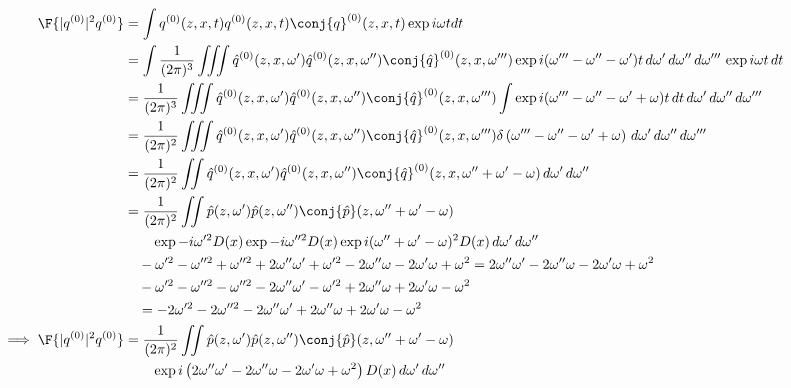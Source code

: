 \begin{equation}
\begin{split}
\F{|q^{(0)}|^2 q^{(0)}} &= \int q^{(0)}(z,x,t)  q^{(0)}(z,x,t) \conj{q}^{(0)}(z,x,t) \exp{i\omega t} dt \\
&= \int \frac{1}{(2\pi)^3} \iiint \hat{q}^{(0)}(z,x,\omega')  \hat{q}^{(0)}(z,x,\omega'') \conj{\hat{q}}^{(0)}(z,x,\omega^{\prime \prime \prime}) \exp{i(\omega^{\prime \prime \prime}-\omega''-\omega')t} \,d\omega' \,d\omega'' \,d\omega^{\prime \prime \prime} \,\exp{i\omega t} \,dt \\
&= \frac{1}{(2\pi)^3} \iiint \hat{q}^{(0)}(z,x,\omega')  \hat{q}^{(0)}(z,x,\omega'') \conj{\hat{q}}^{(0)}(z,x,\omega^{\prime \prime \prime}) \int \exp{i(\omega^{\prime \prime \prime}-\omega''-\omega' +\omega)t} \,dt \,d\omega' \,d\omega'' \,d\omega^{\prime \prime \prime}  \\
&= \frac{1}{(2\pi)^2} \iiint \hat{q}^{(0)}(z,x,\omega')  \hat{q}^{(0)}(z,x,\omega'') \conj{\hat{q}}^{(0)}(z,x,\omega^{\prime \prime \prime}) \delta\left(\omega^{\prime \prime \prime}-\omega''-\omega' +\omega \right) \,d\omega' \,d\omega'' \,d\omega^{\prime \prime \prime} \\
&= \frac{1}{(2\pi)^2} \iint \hat{q}^{(0)}(z,x,\omega')  \hat{q}^{(0)}(z,x,\omega'') \conj{\hat{q}}^{(0)}(z,x,\omega''+\omega'-\omega)  \,d\omega' \,d\omega'' \\
&= \frac{1}{(2\pi)^2} \iint \hat{p}(z,\omega')  \hat{p}(z,\omega'') \conj{\hat{p}}(z,\omega''+\omega'-\omega) \\
&\quad \quad \exp{-i \omega'^2 D(x)} \exp{-i \omega''^2 D(x)} \exp{i (\omega''+\omega'-\omega)^2 D(x)} \,d\omega' \,d\omega'' \\
&\quad  -\omega'^2 -\omega''^2 + \omega''^2 + 2\omega'' \omega' + \omega'^2  - 2\omega'' \omega - 2\omega' \omega +\omega^2 = 2\omega'' \omega' - 2\omega'' \omega - 2\omega' \omega +\omega^2 \\
&\quad  -\omega'^2 -\omega''^2 - \omega''^2 - 2\omega'' \omega' - \omega'^2  + 2\omega'' \omega + 2\omega' \omega - \omega^2 \\
&\quad =  -2\omega'^2 - 2\omega''^2 - 2\omega'' \omega' + 2\omega'' \omega + 2\omega' \omega - \omega^2 \\
\implies \F{|q^{(0)}|^2 q^{(0)}} &= \frac{1}{(2\pi)^2} \iint \hat{p}(z,\omega')  \hat{p}(z,\omega'') \conj{\hat{p}}(z,\omega''+\omega'-\omega)\\
&\quad \quad \exp{i \left( 2\omega'' \omega' - 2\omega'' \omega - 2\omega' \omega +\omega^2\right) D(x)} \,d\omega' \,d\omega'' \\
\end{split}
\end{equation}
